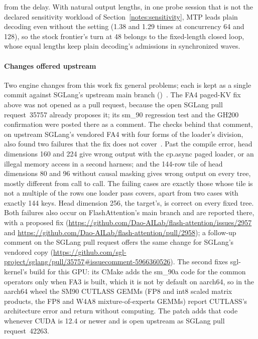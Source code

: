 from the delay. With natural output lengths, in one probe session that is not the declared sensitivity workload of Section~\ref{notes:sensitivity}, MTP leads plain decoding even without the setting (1.38 and 1.29 times at concurrency 64 and 128), so the stock frontier's turn at 48 belongs to the fixed-length closed loop, whose equal lengths keep plain decoding's admissions in synchronized waves.

\paragraph{Changes offered upstream} Two engine changes from this work fix general problems; each is kept as a single commit against SGLang's upstream main branch ()~. The FA4 paged-KV fix above was not opened as a pull request, because the open SGLang pull request~35757 already proposes it; its sm\_90 regression test and the GH200 confirmation were posted there as a comment. The checks behind that comment, on upstream SGLang's vendored FA4 with four forms of the loader's division, also found two failures that the fix does not cover~. Past the compile error, head dimensions 160 and 224 give wrong output with the cp.async paged loader, or an illegal memory access in a second harness; and the 144-row tile of head dimensions 80 and 96 without causal masking gives wrong output on every tree, mostly different from call to call. The failing cases are exactly those whose tile is not a multiple of the rows one loader pass covers, apart from two cases with exactly 144 keys. Head dimension 256, the target's, is correct on every fixed tree. Both failures also occur on FlashAttention's main branch and are reported there, with a proposed fix (\url{https://github.com/Dao-AILab/flash-attention/issues/2957} and \url{https://github.com/Dao-AILab/flash-attention/pull/2958}); a follow-up comment on the SGLang pull request offers the same change for SGLang's vendored copy (\url{https://github.com/sgl-project/sglang/pull/35757#issuecomment-5966360526}). The second fixes sgl-kernel's build for this GPU: its CMake adds the sm\_90a code for the common operators only when FA3 is built, which it is not by default on aarch64, so in the aarch64 wheel the SM90 CUTLASS GEMMs (FP8 and int8 scaled matrix products, the FP8 and W4A8 mixture-of-experts GEMMs) report CUTLASS's architecture error and return without computing. The patch adds that code whenever CUDA is 12.4 or newer and is open upstream as SGLang pull request~42263.

